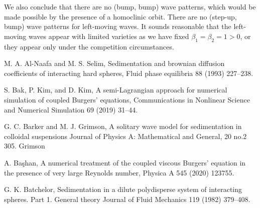 \documentclass{amsart}
\theoremstyle{definition}
\numberwithin{equation}{section}
\begin{document}
We also conclude that there are no (bump, bump) wave patterns, which would be made possible by the presence of a homoclinic orbit. There are no (step-up, bump) wave patterns for left-moving waves. It sounds reasonable that the left-moving waves appear with limited varieties as we have fixed $\beta_1=\beta_2=1>0$, or they appear only under the competition circumstances.



\begin{thebibliography}{10}

        {M. A. Al-Naafa and M. S. Selim},
        {Sedimentation and brownian diffusion coefficients of interacting hard spheres},
        Fluid phase equilibria {88} (1993) 227--238. 






        {S. Bak, P. Kim, and D. Kim}, 
        {A semi-Lagrangian approach for numerical simulation of coupled Burgers’ equations},
        Communications in Nonlinear Science and Numerical Simulation {69} (2019) 31--44.

        {G. C. Barker and M. J. Grimson},
        {A solitary wave model for sedimentation in colloidal suspensions}
        Journal of Physics A: Mathematical and General, {20} no.2 305.
        {Grimson}        
        
        {A. Ba\c{s}han},
        {A numerical treatment of the coupled viscous Burgers' equation in the presence of very large Reynolds number},
        Physica A 545 (2020) 123755.
        
        
        
        {G. K. Batchelor},  
        {Sedimentation in a dilute polydisperse system of interacting spheres. Part 1. General theory} 
        Journal of Fluid Mechanics 119 (1982) 379--408.


\end{thebibliography}
\end{document}
